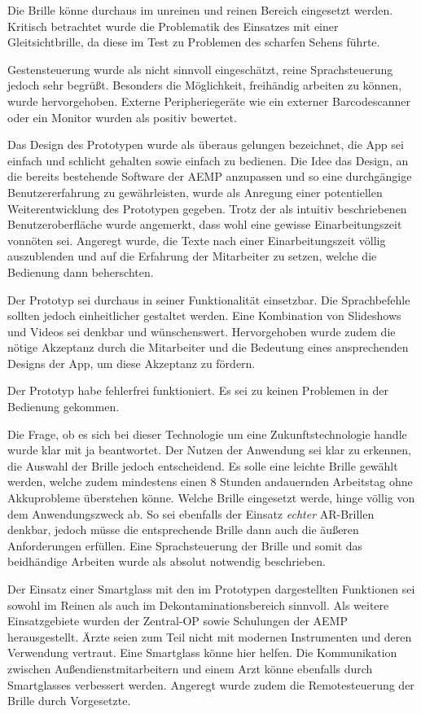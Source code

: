 Die Brille könne durchaus im unreinen und reinen Bereich eingesetzt werden. Kritisch betrachtet wurde die Problematik des Einsatzes mit einer Gleitsichtbrille, da diese im Test zu Problemen des scharfen Sehens führte.

Gestensteuerung wurde als nicht sinnvoll eingeschätzt, reine Sprachsteuerung jedoch sehr begrüßt. Besonders die Möglichkeit, freihändig arbeiten zu können, wurde hervorgehoben. Externe Peripheriegeräte wie ein externer Barcodescanner oder ein Monitor wurden als positiv bewertet.

Das Design des Prototypen wurde als überaus gelungen bezeichnet, die App sei einfach und schlicht gehalten sowie einfach zu bedienen. Die Idee das Design, an die bereits bestehende Software der AEMP anzupassen und so eine durchgängige Benutzererfahrung zu gewährleisten, wurde als Anregung einer potentiellen Weiterentwicklung des Prototypen gegeben. Trotz der als intuitiv beschriebenen Benutzeroberfläche wurde angemerkt, dass wohl eine gewisse Einarbeitungszeit vonnöten sei. Angeregt wurde, die Texte nach einer Einarbeitungszeit völlig auszublenden und auf die Erfahrung der Mitarbeiter zu setzen, welche die Bedienung dann beherschten. 

Der Prototyp sei durchaus in seiner Funktionalität einsetzbar. Die Sprachbefehle sollten jedoch einheitlicher gestaltet werden. Eine Kombination von Slideshows und Videos sei denkbar und wünschenswert. Hervorgehoben wurde zudem die nötige Akzeptanz durch die Mitarbeiter und die Bedeutung eines ansprechenden Designs der App, um diese Akzeptanz zu fördern.

Der Prototyp habe fehlerfrei funktioniert. Es sei zu keinen Problemen in der Bedienung gekommen.

Die Frage, ob es sich bei dieser Technologie um eine Zukunftstechnologie handle wurde klar mit ja beantwortet. Der Nutzen der Anwendung sei klar zu erkennen, die Auswahl der Brille jedoch entscheidend. Es solle eine leichte Brille gewählt werden, welche zudem mindestens einen 8 Stunden andauernden Arbeitstag ohne Akkuprobleme überstehen könne. Welche Brille eingesetzt werde, hinge völlig von dem Anwendungszweck ab. So sei ebenfalls der Einsatz \emph{echter} AR-Brillen denkbar, jedoch müsse die entsprechende Brille dann auch die äußeren Anforderungen erfüllen. Eine Sprachsteuerung der Brille und somit das beidhändige Arbeiten wurde als absolut notwendig beschrieben. 

Der Einsatz einer Smartglass mit den im Prototypen dargestellten Funktionen sei sowohl im Reinen als auch im Dekontaminationsbereich sinnvoll. Als weitere Einsatzgebiete wurden der Zentral-OP sowie Schulungen der AEMP herausgestellt. Ärzte seien zum Teil nicht mit modernen Instrumenten und deren Verwendung vertraut. Eine Smartglass könne hier helfen. Die Kommunikation zwischen Außendienstmitarbeitern und einem Arzt könne ebenfalls durch Smartglasses verbessert werden. Angeregt wurde zudem die Remotesteuerung der Brille durch Vorgesetzte.


